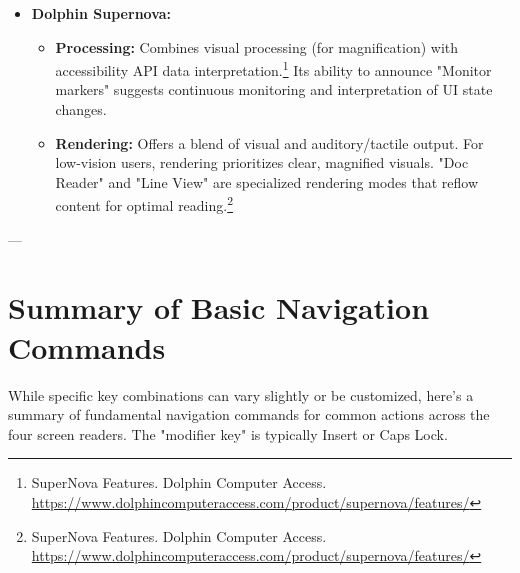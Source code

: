 \begin{itemize}[leftmargin=*,noitemsep,topsep=0pt]
\begin{itemize}[leftmargin=*,noitemsep,topsep=0pt]
        \item \textbf{Processing:} Deeply integrated with the Windows UI Automation framework. Its processing is optimized for the Windows ecosystem.\footnote{Narrator Technical Details. Microsoft Learn. \url{https://learn.microsoft.com/en-us/windows/win32/wnauto/narrator-technical-details}} AI capabilities for image description signify advanced non-textual content interpretation.\footnote{Get image descriptions from Narrator. Microsoft Support. \url{https://support.microsoft.com/en-us/windows/get-image-descriptions-from-narrator-c800c765-b772-4017-8e6c-7f5ddf5b721e}}
        \item \textbf{Rendering:} Aims for a streamlined and integrated experience within Windows. Adapts reading behavior (tab-sequence vs. document reading) based on UI element purpose.\footnote{Narrator Technical Details. Microsoft Learn. \url{https://learn.microsoft.com/en-us/windows/win32/wnauto/narrator-technical-details}}
    \end{itemize}
    \item \textbf{Dolphin Supernova:}
    \begin{itemize}[leftmargin=*,noitemsep,topsep=0pt]
        \item \textbf{Processing:} Combines visual processing (for magnification) with accessibility API data interpretation.\footnote{SuperNova Features. Dolphin Computer Access. \url{https://www.dolphincomputeraccess.com/product/supernova/features/}} Its ability to announce "Monitor markers" suggests continuous monitoring and interpretation of UI state changes.
        \item \textbf{Rendering:} Offers a blend of visual and auditory/tactile output. For low-vision users, rendering prioritizes clear, magnified visuals. "Doc Reader" and "Line View" are specialized rendering modes that reflow content for optimal reading.\footnote{SuperNova Features. Dolphin Computer Access. \url{https://www.dolphincomputeraccess.com/product/supernova/features/}}
    \end{itemize}
\end{itemize}

---

\section{Summary of Basic Navigation Commands}

While specific key combinations can vary slightly or be customized, here's a summary of fundamental navigation commands for common actions across the four screen readers. The "modifier key" is typically Insert or Caps Lock.

